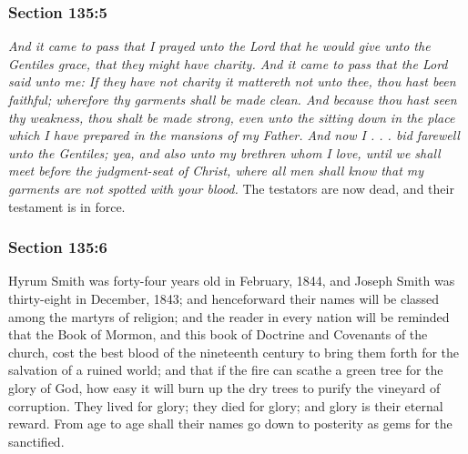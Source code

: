 	\subsubsection{Section 135:5} %
		\label{DC135-5}

		\textit{And it came to pass that I prayed unto the Lord that he would give unto the Gentiles grace, that they might have charity.  And it came to pass that the Lord said unto me: If they have not charity it mattereth not unto thee, thou hast been faithful; wherefore thy garments shall be made clean.  And because thou hast seen thy weakness, thou shalt be made strong, even unto the sitting down in the place which I have prepared in the mansions of my Father.  And now I . . . bid farewell unto the Gentiles; yea, and also unto my brethren whom I love, until we shall meet before the judgment-seat of Christ, where all men shall know that my garments are not spotted with your blood.}  The testators are now dead, and their testament is in force.


	\subsubsection{Section 135:6} %
		\label{DC135-6}

		Hyrum Smith was forty-four years old in February, 1844, and Joseph Smith was thirty-eight in December, 1843; and henceforward their names will be classed among the martyrs of religion; and the reader in every nation will be reminded that the Book of Mormon, and this book of Doctrine and Covenants of the church, cost the best blood of the nineteenth century to bring them forth for the salvation of a ruined world; and that if the fire can scathe a green tree for the glory of God, how easy it will burn up the dry trees to purify the vineyard of corruption.  They lived for glory; they died for glory; and glory is their eternal reward.  From age to age shall their names go down to posterity as gems for the sanctified.


